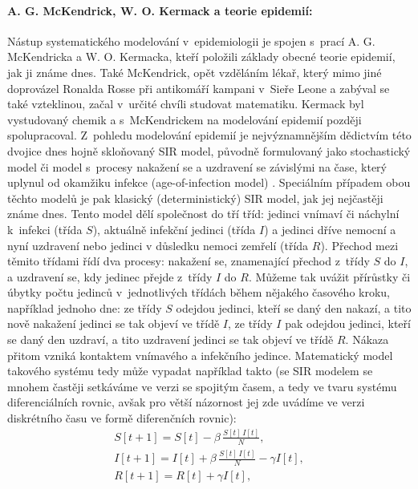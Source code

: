 
\paragraph{A. G. McKendrick, W. O. Kermack a teorie epidemií:} Nástup systematického modelování v~epidemiologii je spojen s~prací A. G. McKendricka a W. O. Kermacka, kteří položili základy obecné teorie epidemií, jak ji známe dnes. Také McKendrick, opět vzděláním lékař, který mimo jiné doprovázel Ronalda Rosse při antikomáří kampani v~Sieře Leone a zabýval se také vzteklinou, začal v~určité chvíli studovat matematiku. Kermack byl vystudovaný chemik a s~McKendrickem na modelování epidemií později spolupracoval. Z~pohledu modelování epidemií je nejvýznamnějším dědictvím této dvojice dnes hojně skloňovaný SIR model, původně formulovaný jako stochastický model \cite{McKendrick1925} či model s~procesy nakažení se a uzdravení se závislými na čase, který uplynul od okamžiku infekce (age-of-infection model) \cite{McKendrickKermack1927,YangBrauer2008}. Speciálním případem obou těchto modelů je pak klasický (deterministický) SIR model, jak jej nejčastěji známe dnes. Tento model dělí společnost do tří tříd: jedinci vnímaví či náchylní k~infekci (třída $S$), aktuálně infekční jedinci (třída $I$) a jedinci dříve nemocní a nyní uzdravení nebo jedinci v důsledku nemoci zemřelí (třída $R$). Přechod mezi těmito třídami řídí dva procesy: nakažení se, znamenající přechod z~třídy $S$ do $I$, a uzdravení se, kdy jedinec přejde z~třídy $I$ do $R$. Můžeme tak uvážit přírůstky či úbytky počtu jedinců v~jednotlivých třídách během nějakého časového kroku, například jednoho dne: ze třídy $S$ odejdou jedinci, kteří se daný den nakazí, a tito nově nakažení jedinci se tak objeví ve třídě $I$, ze třídy $I$ pak odejdou jedinci, kteří se daný den uzdraví, a tito uzdravení jedinci se tak objeví ve třídě $R$. Nákaza přitom vzniká kontaktem vnímavého a infekčního jedince. Matematický model takového systému tedy může vypadat například takto (se SIR modelem se mnohem častěji setkáváme ve verzi se spojitým časem, a tedy ve tvaru systému diferenciálních rovnic, avšak pro větší názornost jej zde uvádíme ve verzi diskrétního času ve formě diferenčních rovnic):
\begin{equation}
\begin{array}{l}
\displaystyle{S[t+1] = S[t] - \beta \, \frac{S[t]\,I[t]}{N}}, \\[3ex]
\displaystyle{I[t+1] = I[t] + \beta \, \frac{S[t]\,I[t]}{N} - \gamma I[t]}, \\[3ex]
\displaystyle{R[t+1] = R[t] + \gamma I[t]},
\end{array}
\label{SIR1}
\end{equation}
